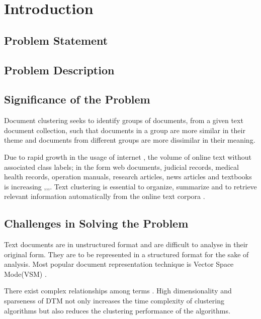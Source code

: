 \setcounter{equation}{0}

\chapter{Introduction}

\section{Problem Statement}
\lipsum[1]

\section{Problem Description}
\lipsum[1]

\section{Significance of the Problem}
Document clustering seeks to identify groups of documents, from a given text document collection, such that documents in a group are more similar in their theme and documents from different groups are more dissimilar in their meaning.

Due to rapid growth in the usage of internet \cite{warf2020}, the volume of online text without associated class labels; in the form web documents, judicial records, medical health records, operation manuals, research articles, news articles and textbooks is increasing \cite{zhai2016},\cite{bharti2014},\cite{feldman2007},\cite{forman2003}. Text clustering is essential to organize, summarize and to retrieve relevant information automatically from the online text corpora \cite{garcia2020}. 

\section{Challenges in Solving the Problem}
 
Text documents are in unstructured format and are difficult to analyse in their original form. They are to be represented in a structured format for the sake of analysis. Most popular document representation technique is Vector Space Mode(VSM) \cite{zapata2000}. 

There exist complex relationships among terms \cite{zapata2000}. High dimensionality and sparseness of DTM not only increases the time complexity of clustering algorithms but also reduces the clustering performance of the algorithms. 


